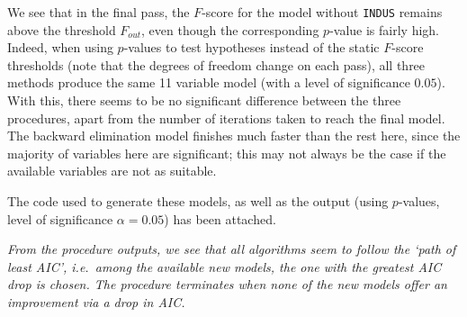 \documentclass[10pt]{article}
\begin{document}
    We see that in the final pass, the $F$-score for the model without \texttt{INDUS}
    remains above the threshold $F_{out}$, even though the corresponding $p$-value is
    fairly high. Indeed, when using $p$-values to test hypotheses instead of the
    static $F$-score thresholds (note that the degrees of freedom change on each
    pass), all three methods produce the same 11 variable model (with a level of
    significance $0.05$). With this, there seems to be no significant difference
    between the three procedures, apart from the number of iterations taken to reach
    the final model. The backward elimination model finishes much faster than the
    rest here, since the majority of variables here are significant; this may not
    always be the case if the available variables are not as suitable.

    The code used to generate these models, as well as the output (using $p$-values,
    level of significance $\alpha = 0.05$) has been attached.

    \textit{From the procedure outputs, we see that all algorithms seem to follow the
    `path of least AIC', i.e.\ among the available new models, the one with the
    greatest AIC drop is chosen. The procedure terminates when none of the new models
    offer an improvement via a drop in AIC.}
\end{document}
